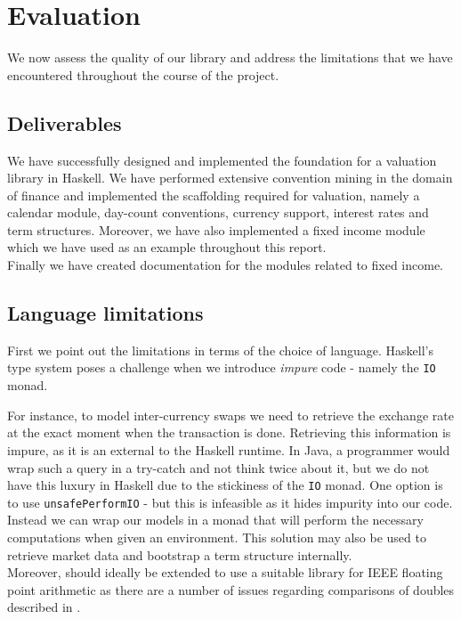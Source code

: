 \chapter{Evaluation}

We now assess the quality of our library and address the limitations that we
have encountered throughout the course of the project.

\section{Deliverables}

We have successfully designed and implemented the foundation for a valuation 
library in Haskell. We have performed extensive convention mining in the domain
of finance and implemented the scaffolding required for valuation, 
namely a calendar module, day-count conventions, currency support, interest 
rates and term structures. Moreover, we have also implemented a fixed income 
module which we have used as an example throughout this report.\\
Finally we have created documentation for the modules related to fixed 
income.

\section{Language limitations}

First we point out the limitations in terms of the choice of language.
Haskell's type system poses a challenge when we introduce
\emph{impure} code - namely the \texttt{IO} monad.

For instance, to model inter-currency swaps we need to retrieve the exchange 
rate at the exact moment when the transaction is done. Retrieving this 
information is impure, as it is an external to the Haskell runtime. In Java, a 
programmer would wrap such a query in a try-catch and not think twice about it,
but we do not have this luxury in Haskell due to the stickiness of the 
\texttt{IO} monad. One option is to use \texttt{unsafePerformIO} - but this is 
infeasible as it hides impurity into our code.
Instead we can wrap our models in a monad that will perform the necessary 
computations when given an environment. This solution may also be used to 
retrieve market data and bootstrap a term structure internally.\\

Moreover, \hql should ideally be extended to use a suitable library for
IEEE floating point arithmetic as there are a number of issues regarding
comparisons of doubles described in \cite{blogpost}.\\

